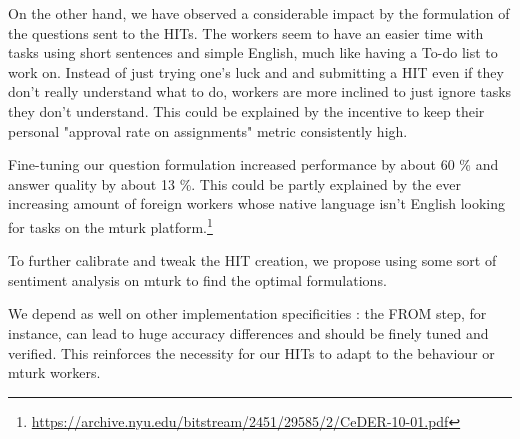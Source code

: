 \documentclass{article}
\begin{document}
On the other hand, we have observed a considerable impact by the formulation of the questions sent to the HITs. The workers seem to have an easier time with tasks using short sentences and simple English, much like having a To-do list to work on. Instead of just trying one's luck and and submitting a HIT even if they don't really understand what to do, workers are more inclined to just ignore tasks they don't understand. This could be explained by the incentive to keep their personal "approval rate on assignments" metric consistently high. 

Fine-tuning our question formulation increased performance by about 60 \% and answer quality by about 13 \%. This could be partly explained by the ever increasing amount of foreign workers whose native language isn't English looking for tasks on the mturk platform.\footnote{\url{https://archive.nyu.edu/bitstream/2451/29585/2/CeDER-10-01.pdf}}

To further calibrate and tweak the HIT creation, we propose using some sort of sentiment analysis on mturk to find the optimal formulations.

We depend as well on other implementation specificities : the FROM step, for instance, can lead to huge accuracy differences and should be finely tuned and verified. This reinforces the necessity for our HITs to adapt to the behaviour or mturk workers. 
\end{document}
